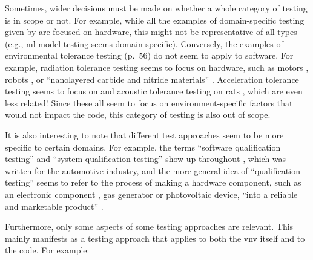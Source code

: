       Sometimes, wider decisions must be made on whether a whole category of
      testing is in scope or not. For example, while all the examples of domain-specific
      testing given by \citet[p.~26]{Firesmith2015} are focused on hardware, this
      might not be representative of all types (e.g., \acf{ml} model testing seems
      domain-specific). Conversely, the examples of environmental tolerance testing
      (p.~56) do not seem to apply to software. For example, radiation tolerance
      testing seems to focus on hardware, such as motors \citep{MukhinEtAl2022},
      robots \citep{ZhangEtAl2020}, or ``nanolayered carbide and nitride materials''
      \citep[p.~1]{TunesEtAl2022}. Acceleration tolerance testing seems to focus on
      \accelTolTest{} and acoustic tolerance testing on rats \citep{HolleyEtAl1996},
      which are even less related! Since these all seem to focus on
      environment-specific factors that would not impact the code, this category of
      testing is also out of scope.

      It is also interesting to note that different test approaches seem to be more
      specific to certain domains. For example, the terms ``software qualification
      testing'' and ``system qualification testing'' show up throughout
      \citep{SPICE2022}, which was written for the automotive industry, and the more
      general idea of ``qualification testing'' seems to refer to the process of
      making a hardware component, such as an electronic component
      \citep{AhsanEtAl2020}, gas generator \citep{ParateEtAl2021} or photovoltaic
      device, ``into a reliable and marketable product'' \citep[p.~1]{SuhirEtAl2013}.
\fi

Furthermore, only some aspects of some testing approaches are relevant. This
mainly manifests as a testing approach that applies to both the \acs{vnv} itself
and to the code. For example:

